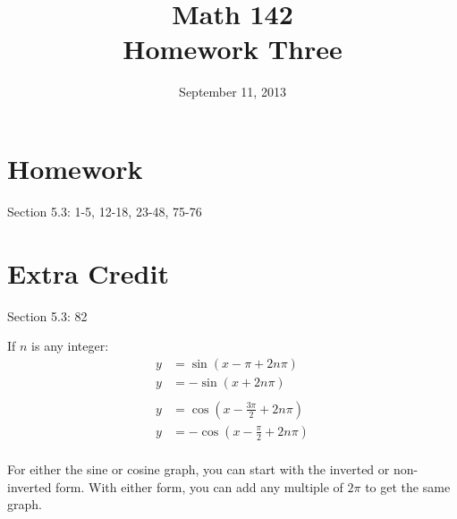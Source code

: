 \documentclass{exam}
\author{}
\date{September 11, 2013}
\title{Math 142 \\ Homework Three}
\begin{document}
  \maketitle

  \section{Homework}
  Section 5.3: 1-5, 12-18, 23-48, 75-76

  \section{Extra Credit}
  Section 5.3: 82

  \ifprintanswers

    If $n$ is any integer:
    \begin{align*}
      y  & = \sin (x - \pi + 2n\pi) \\
      y  & = - \sin (x + 2n \pi) \\
      \\
      y  & = \cos \left( x - \frac{3 \pi}{2} + 2n\pi\right ) \\
      y  & = - \cos \left( x - \frac{\pi}{2} + 2n\pi\right ) \\
    \end{align*}

    For either the sine or cosine graph, you can start with the inverted or non-inverted form.  With either form, you can
    add any multiple of $2 \pi$ to get the same graph.
\end{document}
